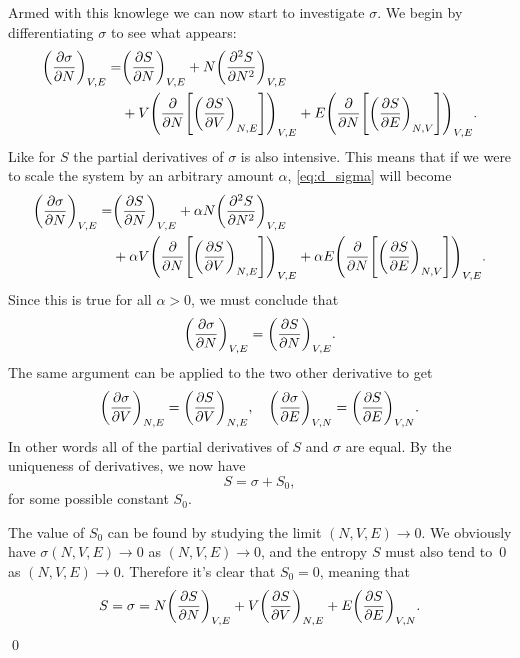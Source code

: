 \documentclass[11pt,letter, swedish, english
]{article}
\begin{document}
Armed with this knowlege we can now start to investigate
$\sigma$. We begin by differentiating $\sigma$ to see what appears:
\begin{equation}\label{eq:d_sigma}
\begin{aligned}
\qty(\pdv{\sigma}{N})_{V,E} 
=& \qty(\pdv{S}{N})_{V,E} + N\qty(\pdv[2]{S}{N})_{V,E}\\ 
&+ V \qty(\pdv{N}\qty[\qty(\pdv{S}{V})_{N,E}])_{V,E}
+ E \qty(\pdv{N}\qty[\qty(\pdv{S}{E})_{N,V}])_{V,E}.
\end{aligned}
\end{equation}
Like for $S$ the partial derivatives of $\sigma$ is also
intensive. This means that if we were to scale the system by an
arbitrary amount $\alpha$, \eqref{eq:d_sigma} will become\footnotemark{}
\begin{equation}
\begin{aligned}
\qty(\pdv{\sigma}{N})_{V,E} 
=& \qty(\pdv{S}{N})_{V,E} + \alpha N\qty(\pdv[2]{S}{N})_{V,E}\\ 
&+ \alpha V \qty(\pdv{N}\qty[\qty(\pdv{S}{V})_{N,E}])_{V,E}
+ \alpha E \qty(\pdv{N}\qty[\qty(\pdv{S}{E})_{N,V}])_{V,E}.
\end{aligned}
\end{equation}
Since this is true for all $\alpha>0$, we must conclude that
\begin{equation}
\qty(\pdv{\sigma}{N})_{V,E} 
= \qty(\pdv{S}{N})_{V,E}.
\end{equation}
The same argument can be applied to the two other derivative to get
\begin{equation}
\qty(\pdv{\sigma}{V})_{N,E} = \qty(\pdv{S}{V})_{N,E}
\qcomma
\qty(\pdv{\sigma}{E})_{V,N} = \qty(\pdv{S}{E})_{V,N}.
\end{equation}
In other words all of the partial derivatives of $S$ and $\sigma$ are
equal. By the uniqueness of derivatives, we now have
\begin{equation}
S=\sigma+S_0,
\end{equation}
for some possible constant $S_0$. 

The value of $S_0$ can be found by studying the limit 
$(N, V, E)\to0$. We obviously have
$\sigma(N, V, E)\to 0$ as $(N, V, E)\to0$,
and the entropy $S$ must also tend to~0 as $(N, V, E)\to0$. Therefore
it's clear that $S_0=0$, meaning that
\begin{equation}
S=\sigma
= N\qty(\pdv{S}{N})_{V,E} 
+ V\qty(\pdv{S}{V})_{N,E}
+ E\qty(\pdv{S}{E})_{V,N}.
\end{equation}
\qed
\end{document}
